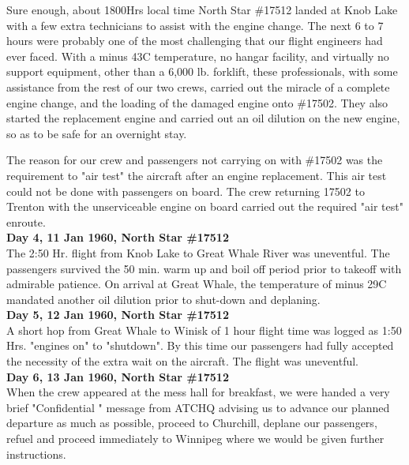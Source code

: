 Sure enough, about 1800Hrs local time North Star \#17512 landed at Knob
Lake with a few extra technicians to assist with the engine change. The
next 6 to 7 hours were probably one of the most challenging that our
flight engineers had ever faced. With a minus 43C temperature, no
hangar facility, and virtually no support equipment, other than a 6,000
lb. forklift, these professionals, with some assistance from the rest
of our two crews, carried out the miracle of a complete engine change,
and the loading of the damaged engine onto \#17502. They also started
the replacement engine and carried out an oil dilution on the new
engine, so as to be safe for an overnight stay.

The reason for our crew and passengers not carrying on with \#17502 was
the requirement to "air test" the aircraft after an engine replacement.
This air test could not be done with passengers on board. The crew
returning 17502 to Trenton with the unserviceable engine on board
carried out the required "air test" enroute.\\

\noindent\textbf{Day 4, 11 Jan 1960, North Star \#17512}\\

The 2:50 Hr. flight from Knob Lake to Great Whale River was uneventful.
The passengers survived the 50 min. warm up and boil off period prior
to takeoff with admirable patience. On arrival at Great Whale, the
temperature of minus 29C mandated another oil dilution prior to
shut-down and deplaning.\\

\noindent\textbf{Day 5, 12 Jan 1960, North Star \#17512}\\

A short hop from Great Whale to Winisk of 1 hour flight time was logged
as 1:50 Hrs. "engines on" to "shutdown". By this time our passengers
had fully accepted the necessity of the extra wait on the aircraft. The
flight was uneventful.\\

\noindent\textbf{Day 6, 13 Jan 1960, North Star \#17512}\\

When the crew appeared at the mess hall for breakfast, we were handed a
very brief "Confidential " message from ATCHQ advising us to advance
our planned departure as much as possible, proceed to Churchill,
deplane our passengers, refuel and proceed immediately to Winnipeg
where we would be given further instructions.

